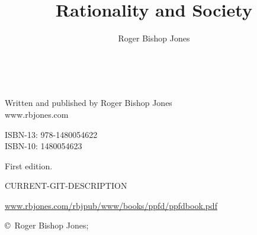 \documentclass[10pt,titlepage]{book}
\author{Roger Bishop Jones}
\title{Rationality and Society}
\newcommand{\ignore}[1]{}
\begin{document}
\frontmatter

\begin{titlepage}
\maketitle

\vfill

\begin{centering}

\ignore{
{\parskip=0.3in
This book is dedicated to

{\relsize{+3} Barbara Anne Jones}
}
}
\ 

\vfill
Written and published by Roger Bishop Jones\\
www.rbjones.com\\
\vspace{0.2in}

ISBN-13: 978-1480054622\\
ISBN-10: 1480054623

\vspace{0.2in}

{\footnotesize

First edition.

\vspace{0.2in}

\tiny{CURRENT-GIT-DESCRIPTION}

\vspace{0.2in}


\href{http://www.rbjones.com/rbjpub/www/books/ppfd/ppfdbook.pdf}{www.rbjones.com/rbjpub/www/books/ppfd/ppfdbook.pdf}


\copyright\ Roger Bishop Jones;

}%

\end{centering}

\thispagestyle{empty}
\end{titlepage}

{\parskip=0pt\tableofcontents}
\end{document}
